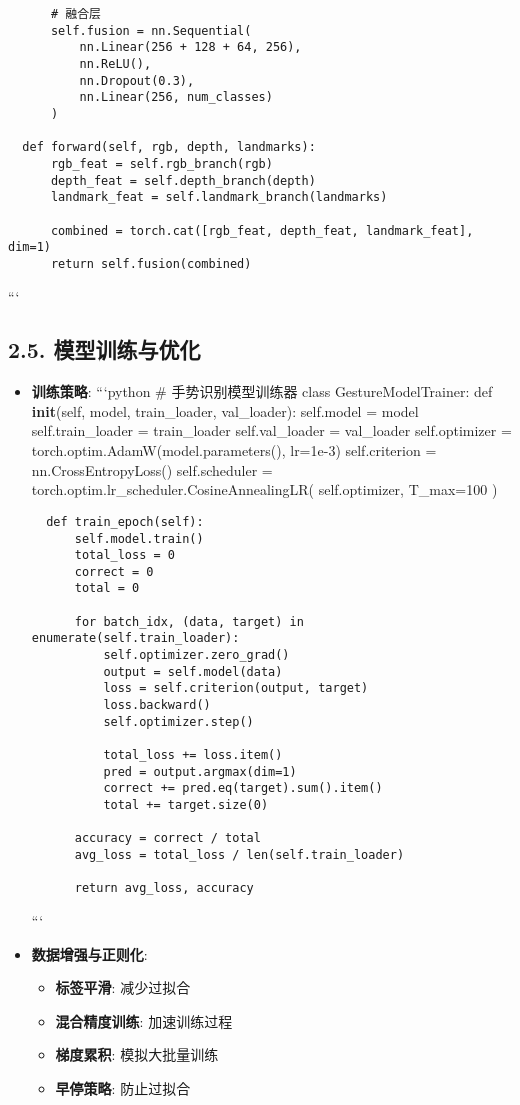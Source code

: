 \begin{itemize}
\begin{lstlisting}
      # 融合层
      self.fusion = nn.Sequential(
          nn.Linear(256 + 128 + 64, 256),
          nn.ReLU(),
          nn.Dropout(0.3),
          nn.Linear(256, num_classes)
      )

  def forward(self, rgb, depth, landmarks):
      rgb_feat = self.rgb_branch(rgb)
      depth_feat = self.depth_branch(depth)
      landmark_feat = self.landmark_branch(landmarks)

      combined = torch.cat([rgb_feat, depth_feat, landmark_feat], dim=1)
      return self.fusion(combined)
\end{lstlisting}

  ```
\end{itemize}

\subsection{2.5.
模型训练与优化}\label{ux6a21ux578bux8badux7ec3ux4e0eux4f18ux5316}

\begin{itemize}
\item
  \textbf{训练策略}: ```python \# 手势识别模型训练器 class
  GestureModelTrainer: def \textbf{init}(self, model, train\_loader,
  val\_loader): self.model = model self.train\_loader = train\_loader
  self.val\_loader = val\_loader self.optimizer =
  torch.optim.AdamW(model.parameters(), lr=1e-3) self.criterion =
  nn.CrossEntropyLoss() self.scheduler =
  torch.optim.lr\_scheduler.CosineAnnealingLR( self.optimizer,
  T\_max=100 )

\begin{lstlisting}
  def train_epoch(self):
      self.model.train()
      total_loss = 0
      correct = 0
      total = 0

      for batch_idx, (data, target) in enumerate(self.train_loader):
          self.optimizer.zero_grad()
          output = self.model(data)
          loss = self.criterion(output, target)
          loss.backward()
          self.optimizer.step()

          total_loss += loss.item()
          pred = output.argmax(dim=1)
          correct += pred.eq(target).sum().item()
          total += target.size(0)

      accuracy = correct / total
      avg_loss = total_loss / len(self.train_loader)

      return avg_loss, accuracy
\end{lstlisting}

  ```
\item
  \textbf{数据增强与正则化}:

  \begin{itemize}
  \tightlist
  \item
    \textbf{标签平滑}: 减少过拟合
  \item
    \textbf{混合精度训练}: 加速训练过程
  \item
    \textbf{梯度累积}: 模拟大批量训练
  \item
    \textbf{早停策略}: 防止过拟合
  \end{itemize}
\end{itemize}


